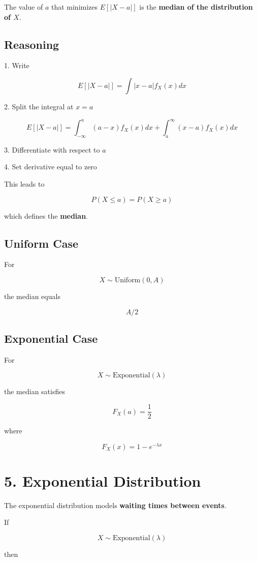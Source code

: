 \documentclass[12pt]{article}
\begin{document}
The value of $a$ that minimizes $E[|X-a|]$ is the \textbf{median of the distribution of $X$}.

\subsection*{Reasoning}

1. Write

\[
E[|X-a|] = \int |x-a| f_X(x) dx
\]

2. Split the integral at $x=a$

\[
E[|X-a|] =
\int_{-\infty}^{a}(a-x)f_X(x)dx
+
\int_{a}^{\infty}(x-a)f_X(x)dx
\]

3. Differentiate with respect to $a$

4. Set derivative equal to zero

This leads to

\[
P(X \le a) = P(X \ge a)
\]

which defines the \textbf{median}.

\subsection*{Uniform Case}

For

\[
X \sim \text{Uniform}(0,A)
\]

the median equals

\[
A/2
\]

\subsection*{Exponential Case}

For

\[
X \sim \text{Exponential}(\lambda)
\]

the median satisfies

\[
F_X(a)=\frac12
\]

where

\[
F_X(x)=1-e^{-\lambda x}
\]

\section*{5. Exponential Distribution}

The exponential distribution models \textbf{waiting times between events}.

If

\[
X \sim \text{Exponential}(\lambda)
\]

then
\end{document}

